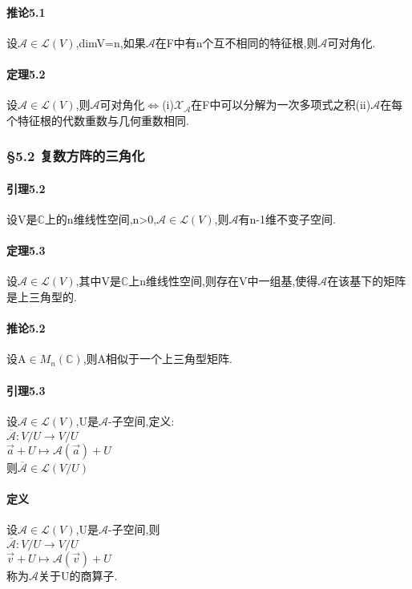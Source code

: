 \documentclass{ctexart}
\begin{document}
\paragraph{推论5.1}
设$\mathcal{A}\in\mathcal{L}(V)$,dimV=n,如果$\mathcal{A}$在F中有n个互不相同的特征根,则$\mathcal{A}$可对角化.

\paragraph{定理5.2}
设$\mathcal{A}\in\mathcal{L}(V)$,则$\mathcal{A}$可对角化$\Leftrightarrow$(i)$\mathcal{X}_{\mathcal{A}}$在F中可以分解为一次多项式之积(ii)$\mathcal{A}$在每个特征根的代数重数与几何重数相同.

\subsubsection{§5.2 复数方阵的三角化}

\paragraph{引理5.2}
设V是$\mathbb{C}$上的n维线性空间,n>0,$\mathcal{A}\in\mathcal{L}(V)$,则$\mathcal{A}$有n-1维不变子空间.

\paragraph{定理5.3}
设$\mathcal{A}\in\mathcal{L}(V)$,其中V是$\mathbb{C}$上n维线性空间,则存在V中一组基,使得$\mathcal{A}$在该基下的矩阵是上三角型的.

\paragraph{推论5.2}
设A$\in M_{n}(\mathbb{C})$,则A相似于一个上三角型矩阵.

\paragraph{引理5.3}
设$\mathcal{A}\in\mathcal{L}(V)$,U是$\mathcal{A}$-子空间,定义: \\
$\overline{\mathcal{A}}:V/U \to V/U$\\
$\vec{a}+U\mapsto\mathcal{A}(\vec{a})+U$\\
则$\overline{\mathcal{A}}\in\mathcal{L}(V/U)$

\paragraph{定义}
设$\mathcal{A}\in\mathcal{L}(V)$,U是$\mathcal{A}$-子空间,则\\
$\overline{\mathcal{A}}:V/U \to V/U$\\
$\vec{v}+U\mapsto\mathcal{A}(\vec{v})+U$\\
称为$\mathcal{A}$关于U的商算子.
\end{document}
